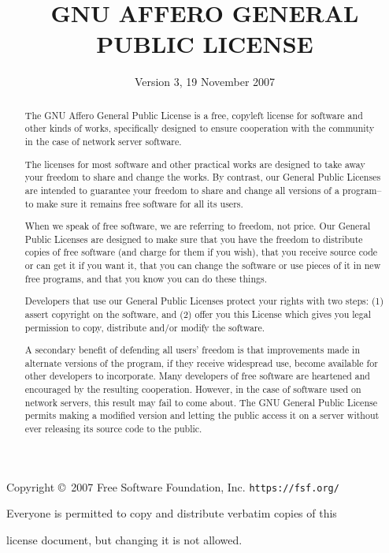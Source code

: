 \documentclass[11pt]{article}
\title{GNU AFFERO GENERAL PUBLIC LICENSE}
\date{Version 3, 19 November 2007}
\begin{document}
\maketitle

\begin{center}
    {\parindent 0in

        Copyright \copyright\  2007 Free Software Foundation, Inc. \texttt{https://fsf.org/}

        \bigskip
        Everyone is permitted to copy and distribute verbatim copies of this

        license document, but changing it is not allowed.}

\end{center}

\renewcommand{\abstractname}{Preamble}
\begin{abstract}
    The GNU Affero General Public License is a free, copyleft license
    for software and other kinds of works, specifically designed to ensure
    cooperation with the community in the case of network server software.

    The licenses for most software and other practical works are
    designed to take away your freedom to share and change the works.  By
    contrast, our General Public Licenses are intended to guarantee your
    freedom to share and change all versions of a program--to make sure it
    remains free software for all its users.

    When we speak of free software, we are referring to freedom, not
    price.  Our General Public Licenses are designed to make sure that you
    have the freedom to distribute copies of free software (and charge for
    them if you wish), that you receive source code or can get it if you
    want it, that you can change the software or use pieces of it in new
    free programs, and that you know you can do these things.

    Developers that use our General Public Licenses protect your rights
    with two steps: (1) assert copyright on the software, and (2) offer
    you this License which gives you legal permission to copy, distribute
    and/or modify the software.

    A secondary benefit of defending all users' freedom is that
    improvements made in alternate versions of the program, if they
    receive widespread use, become available for other developers to
    incorporate.  Many developers of free software are heartened and
    encouraged by the resulting cooperation.  However, in the case of
    software used on network servers, this result may fail to come about.
    The GNU General Public License permits making a modified version and
    letting the public access it on a server without ever releasing its
    source code to the public.


\end{abstract}
\end{document}
